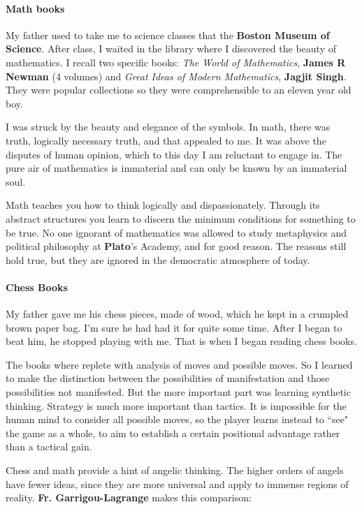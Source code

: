 \paragraph{Math books}
My father used to take me to science classes that the \textbf{Boston Museum of Science}. After class, I waited in the library where I discovered the beauty of mathematics. I recall two specific books: \emph{The World of Mathematics}, \textbf{James R Newman} (4 volumes) and \emph{Great Ideas of Modern Mathematics}, \textbf{Jagjit Singh}. They were popular collections so they were comprehensible to an eleven year old boy.

I was struck by the beauty and elegance of the symbols. In math, there was truth, logically necessary truth, and that appealed to me. It was above the disputes of human opinion, which to this day I am reluctant to engage in. The pure air of mathematics is immaterial and can only be known by an immaterial soul.

Math teaches you how to think logically and dispassionately. Through its abstract structures you learn to discern the minimum conditions for something to be true. No one ignorant of mathematics was allowed to study metaphysics and political philosophy at \textbf{Plato}'s Academy, and for good reason. The reasons still hold true, but they are ignored in the democratic atmosphere of today.

\paragraph{Chess Books}
My father gave me his chess pieces, made of wood, which he kept in a crumpled brown paper bag. I'm sure he had had it for quite some time. After I began to beat him, he stopped playing with me. That is when I began reading chess books.

The books where replete with analysis of moves and possible moves. So I learned to make the distinction between the possibilities of manifestation and those possibilities not manifested. But the more important part was learning synthetic thinking. Strategy is much more important than tactics. It is impossible for the human mind to consider all possible moves, so the player learns instead to ``see" the game as a whole, to aim to establish a certain positional advantage rather than a tactical gain.

Chess and math provide a hint of angelic thinking. The higher orders of angels have fewer ideas, since they are more universal and apply to immense regions of reality. \textbf{Fr. Garrigou-Lagrange} makes this comparison:


